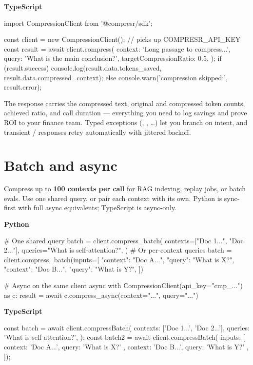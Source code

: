 \documentclass[10pt]{article}
\begin{document}
\textbf{TypeScript}
\begin{tscode}
import { CompressionClient } from '@compresr/sdk';

const client = new CompressionClient();   // picks up COMPRESR_API_KEY
const result = await client.compress({
  context: 'Long passage to compress...',
  query: 'What is the main conclusion?',
  targetCompressionRatio: 0.5,
});
if (result.success) {
  console.log(result.data.tokens_saved, result.data.compressed_context);
} else {
  console.warn('compression skipped:', result.error);
}
\end{tscode}

The response carries the compressed text, original and compressed token
counts, achieved ratio, and call duration — everything you need to log
savings and prove ROI to your finance team. Typed exceptions
(, ,
\ldots) let you branch on intent, and transient /
responses retry automatically with jittered backoff.

\section{Batch and async}

Compress up to \textbf{100 contexts per call} for RAG indexing, replay
jobs, or batch evals. Use one shared query, or pair each context with
its own. Python is sync-first with full async equivalents; TypeScript
is async-only.

\textbf{Python}
\begin{pycode}
# One shared query
batch = client.compress_batch(
    contexts=["Doc 1...", "Doc 2..."],
    queries="What is self-attention?",
)
# Or per-context queries
batch = client.compress_batch(inputs=[
    {"context": "Doc A...", "query": "What is X?"},
    {"context": "Doc B...", "query": "What is Y?"},
])

# Async on the same client
async with CompressionClient(api_key="cmp_...") as c:
    result = await c.compress_async(context="...", query="...")
\end{pycode}

\textbf{TypeScript}
\begin{tscode}
const batch = await client.compressBatch({
  contexts: ['Doc 1...', 'Doc 2...'],
  queries: 'What is self-attention?',
});
const batch2 = await client.compressBatch({ inputs: [
  { context: 'Doc A...', query: 'What is X?' },
  { context: 'Doc B...', query: 'What is Y?' },
]});
\end{tscode}
\end{document}
